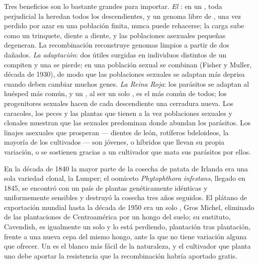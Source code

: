 \begin{proposition}\label{prop:b2:asexual-reproduction:whysex}
Tres beneficios son lo bastante grandes para importar. \emph{El }: en un , toda  perjudicial la heredan todos los
descendientes, y un genoma libre de , una vez perdido por azar
en una población finita, nunca puede rehacerse; la carga sube como un
trinquete, diente a diente, y las poblaciones asexuales pequeñas
degeneran. La recombinación reconstruye genomas limpios a partir de dos
dañados. \emph{La adaptación}: dos  útiles surgidas en
individuos distintos de un  compiten y una se pierde; en una
población sexual se combinan (Fisher y Muller, década de 1930), de modo
que las poblaciones sexuales se adaptan más deprisa cuando deben cambiar
muchos genes. \emph{La Reina Roja}: los parásitos se adaptan al 
huésped más común, y un , al ser un solo , es el más común de
todos; los progenitores sexuales hacen de cada descendiente una
cerradura nueva. Los caracoles, los peces y las plantas que tienen a la
vez poblaciones sexuales y clonales muestran que las sexuales predominan
donde abundan los parásitos. Los linajes asexuales que prosperan ---
dientes de león, rotíferos bdeloideos, la mayoría de los 
cultivados --- son jóvenes, o  híbridos que llevan su propia
variación, o se sostienen gracias a un cultivador que mata sus parásitos
por ellos.
\end{proposition}

\begin{example}\label{ex:b2:asexual-reproduction:monoculture}
En la década de 1840 la mayor parte de la cosecha de patata de Irlanda
era una sola variedad clonal, la Lumper; el oomiceto \emph{Phytophthora
infestans}, llegado en 1845, se encontró con un país de plantas
genéticamente idénticas y uniformemente sensibles y destruyó la cosecha
tres años seguidos. El plátano de exportación mundial hasta la década de
1950 era un solo , Gros Michel, eliminado de las plantaciones de
Centroamérica por un hongo del suelo; su sustituto, Cavendish, es
igualmente un solo  y lo está perdiendo, plantación tras plantación,
frente a una nueva cepa del mismo hongo, ante la que no tiene variación
alguna que ofrecer. Un  es el blanco más fácil de la naturaleza, y el
cultivador que planta uno debe aportar la resistencia que la
recombinación habría aportado gratis.
\end{example}

